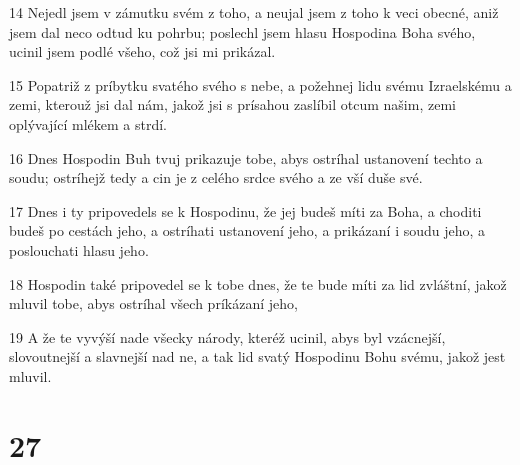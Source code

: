 \par 14 Nejedl jsem v zámutku svém z toho, a neujal jsem z toho k veci obecné, aniž jsem dal neco odtud ku pohrbu; poslechl jsem hlasu Hospodina Boha svého, ucinil jsem podlé všeho, což jsi mi prikázal.
\par 15 Popatriž z príbytku svatého svého s nebe, a požehnej lidu svému Izraelskému a zemi, kterouž jsi dal nám, jakož jsi s prísahou zaslíbil otcum našim, zemi oplývající mlékem a strdí.
\par 16 Dnes Hospodin Buh tvuj prikazuje tobe, abys ostríhal ustanovení techto a soudu; ostríhejž tedy a cin je z celého srdce svého a ze vší duše své.
\par 17 Dnes i ty pripovedels se k Hospodinu, že jej budeš míti za Boha, a choditi budeš po cestách jeho, a ostríhati ustanovení jeho, a prikázaní i soudu jeho, a poslouchati hlasu jeho.
\par 18 Hospodin také pripovedel se k tobe dnes, že te bude míti za lid zvláštní, jakož mluvil tobe, abys ostríhal všech príkázaní jeho,
\par 19 A že te vyvýší nade všecky národy, kteréž ucinil, abys byl vzácnejší, slovoutnejší a slavnejší nad ne, a tak lid svatý Hospodinu Bohu svému, jakož jest mluvil.

\chapter{27}

